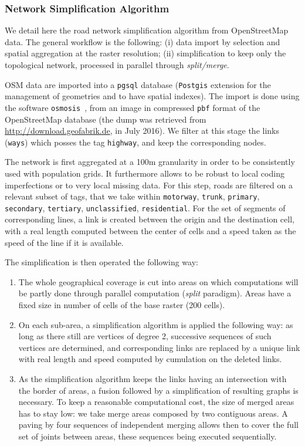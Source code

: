 \subsubsection{Network Simplification Algorithm}


We detail here the road network simplification algorithm from OpenStreetMap data. The general workflow is the following: (i) data import by selection and spatial aggregation at the raster resolution; (ii) simplification to keep only the topological network, processed in parallel through \emph{split/merge}.

OSM data are imported into a \texttt{pgsql} database (\texttt{Postgis} extension for the management of geometries and to have spatial indexes). The import is done using the software \texttt{osmosis}~\cite{osmosis}, from an image in compressed \texttt{pbf} format of the OpenStreetMap database (the dump was retrieved from \url{http://download.geofabrik.de}, in July 2016). We filter at this stage the links (\texttt{ways}) which posses the tag \texttt{highway}, and keep the corresponding nodes.


The network is first aggregated at a 100m granularity in order to be consistently used with population grids. It furthermore allows to be robust to local coding imperfections or to very local missing data. For this step, roads are filtered on a relevant subset of tags, that we take within \texttt{motorway}, \texttt{trunk}, \texttt{primary}, \texttt{secondary}, \texttt{tertiary}, \texttt{unclassified}, \texttt{residential}. For the set of segments of corresponding lines, a link is created between the origin and the destination cell, with a real length computed between the center of cells and a speed taken as the speed of the line if it is available.

The simplification is then operated the following way:
\begin{enumerate}
\item The whole geographical coverage is cut into areas on which computations will be partly done through parallel computation (\emph{split} paradigm). Areas have a fixed size in number of cells of the base raster (200 cells).
\item On each sub-area, a simplification algorithm is applied the following way: as long as there still are vertices of degree 2, successive sequences of such vertices are determined, and corresponding links are replaced by a unique link with real length and speed computed by cumulation on the deleted links.
\item As the simplification algorithm keeps the links having an intersection with the border of areas, a fusion followed by a simplification of resulting graphs is necessary. To keep a reasonable computational cost, the size of merged areas has to stay low: we take merge areas composed by two contiguous areas. A paving by four sequences of independent merging allows then to cover the full set of joints between areas, these sequences being executed sequentially.
\end{enumerate}


